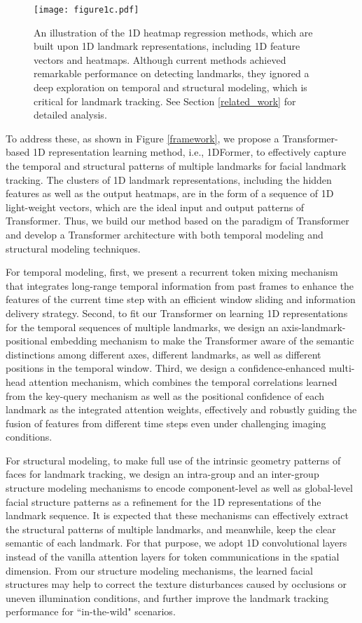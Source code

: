 \documentclass[review]{elsarticle}
\begin{document}
\begin{figure}[t]
	\centering
	\texttt{[image: figure1c.pdf]}
	\caption{An illustration of the 1D heatmap regression methods, which are built upon 1D landmark representations, including 1D feature vectors and heatmaps. Although current methods achieved remarkable performance on detecting landmarks, they ignored a deep exploration on temporal and structural modeling, which is critical for landmark tracking. See Section \ref{related_work} for detailed analysis.}
	\label{DRL}
\end{figure}


To address these, as shown in Figure \ref{framework}, we propose a Transformer-based 1D representation learning method, i.e., 1DFormer, to effectively capture the temporal and structural patterns of multiple landmarks for facial landmark tracking.  The clusters of 1D landmark representations, including the hidden features as well as the output heatmaps, are in the form of a sequence of 1D light-weight vectors, which are the ideal input and output patterns of Transformer. Thus, we build our method based on the paradigm of Transformer and develop a Transformer architecture with both temporal modeling and structural modeling techniques. 

For temporal modeling, first, we present a recurrent token mixing mechanism that integrates long-range temporal information from past frames to enhance the features of the current time step with an efficient window sliding and information delivery strategy. Second, to fit our Transformer on learning 1D representations for the temporal sequences of multiple landmarks, we design an axis-landmark-positional embedding mechanism to make the Transformer aware of the semantic distinctions among different axes, different landmarks, as well as different positions in the temporal window. Third, we design a confidence-enhanced multi-head attention mechanism, which combines the temporal correlations learned from the key-query mechanism as well as the positional confidence of each landmark as the integrated attention weights, effectively and robustly guiding the fusion of features from different time steps even under challenging imaging conditions.

For structural modeling, to make full use of the intrinsic geometry patterns of faces for landmark tracking, we design an intra-group and an inter-group structure modeling mechanisms to encode component-level as well as global-level facial structure patterns as a refinement for the 1D representations of the landmark sequence. It is expected that these mechanisms can effectively extract the structural patterns of multiple landmarks, and meanwhile, keep the clear semantic of each landmark. For that purpose, we adopt 1D convolutional layers instead of the vanilla attention layers for token communications in the spatial dimension. From our structure modeling mechanisms, the learned facial structures may help to correct the texture disturbances caused by occlusions or uneven illumination conditions, and further improve the landmark tracking performance for ``in-the-wild" scenarios.
\end{document}

